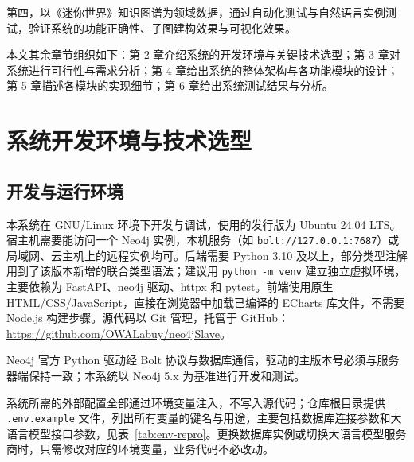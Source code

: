\documentclass[12pt,a4paper]{article}
\begin{document}
第四，以《迷你世界》知识图谱为领域数据，通过自动化测试与自然语言实例测试，验证系统的功能正确性、子图建构效果与可视化效果。

本文其余章节组织如下：第 2 章介绍系统的开发环境与关键技术选型；第 3 章对系统进行可行性与需求分析；第 4 章给出系统的整体架构与各功能模块的设计；第 5 章描述各模块的实现细节；第 6 章给出系统测试结果与分析。

\newpage

\section{系统开发环境与技术选型}

\subsection{开发与运行环境}
\label{subsec:repo-and-paths}

本系统在 GNU/Linux 环境下开发与调试，使用的发行版为 Ubuntu 24.04 LTS。宿主机需要能访问一个 Neo4j 实例，本机服务（如 \texttt{bolt://127.0.0.1:7687}）或局域网、云主机上的远程实例均可。后端需要 Python 3.10 及以上，部分类型注解用到了该版本新增的联合类型语法；建议用 \texttt{python -m venv} 建立独立虚拟环境，主要依赖为 FastAPI、neo4j 驱动、httpx 和 pytest。前端使用原生 HTML/CSS/JavaScript，直接在浏览器中加载已编译的 ECharts 库文件，不需要 Node.js 构建步骤。源代码以 Git 管理，托管于 GitHub：\url{https://github.com/OWALabuy/neo4jSlave}。

Neo4j 官方 Python 驱动经 Bolt 协议与数据库通信，驱动的主版本号必须与服务器端保持一致；本系统以 Neo4j 5.x 为基准进行开发和测试。

系统所需的外部配置全部通过环境变量注入，不写入源代码；仓库根目录提供 \texttt{.env.example} 文件，列出所有变量的键名与用途，主要包括数据库连接参数和大语言模型接口参数，见表~\ref{tab:env-repro}。更换数据库实例或切换大语言模型服务商时，只需修改对应的环境变量，业务代码不必改动。
\end{document}
